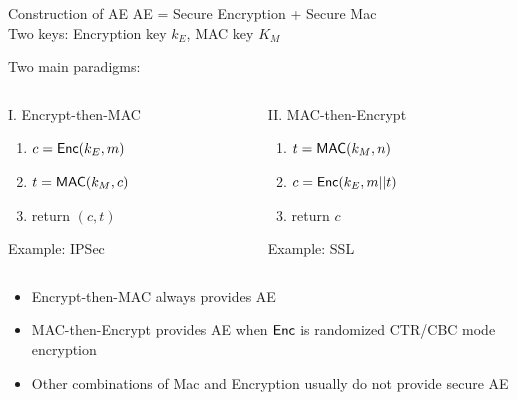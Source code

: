 \documentclass[usenames,dvipsnames, 9pt]{beamer}
\begin{document}
\begin{frame}{Construction of AE}
\Large 
\centering
{\color{Orange} AE = Secure Encryption + Secure Mac} \\[10pt]

Two keys: Encryption key $k_E$, MAC key $K_M$ \\
\pause 
\begin{center}
	Two main paradigms:
\end{center}
\vspace{10pt}

\begin{columns}
	\begin{column}{0.5\linewidth}
	{\color{Orange} I. Encrypt-then-MAC}
	\begin{enumerate}
		\item $c = \textsf{Enc}(k_E, m)$
		\item $t = \textsf{MAC}(k_M, c)$
		\item return $(c,t)$
	\end{enumerate}
Example: IPSec 
	\end{column} \pause
	\begin{column}{0.5\linewidth}
	 {\color{Orange} II. MAC-then-Encrypt}
		\begin{enumerate}
			\item $t = \textsf{MAC}(k_M, n) $
			\item $c = \textsf{Enc}(k_E, m||t)$
			\item return $c$
		\end{enumerate}
		Example: SSL 
\end{column}
\end{columns}

\vspace{10pt}

\pause
\begin{itemize}
	\item  Encrypt-then-MAC always provides AE
	\item MAC-then-Encrypt provides AE when $\textsf{Enc}$ is randomized CTR/CBC mode encryption
	\item Other combinations of Mac and Encryption usually do not provide secure AE
\end{itemize}

\end{frame}
\end{document}

